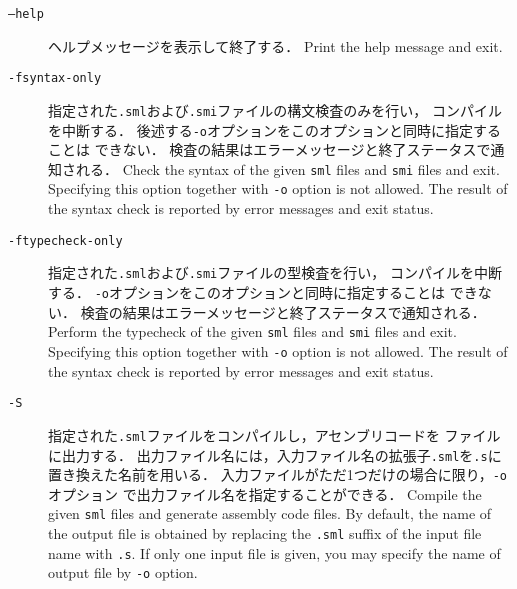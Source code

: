 \documentclass{jbook}
\begin{document}
\begin{description}
\item[{\tt --help}]
\ifjp%
	ヘルプメッセージを表示して終了する．
\else%
	Print the help message and exit.
\fi%

\item[{\tt -fsyntax-only}]
\ifjp%
	指定された{\tt .sml}および{\tt .smi}ファイルの構文検査のみを行い，
コンパイルを中断する．
	後述する{\tt -o}オプションをこのオプションと同時に指定することは
できない．
	検査の結果はエラーメッセージと終了ステータスで通知される．
\else%
	Check the syntax of the given {\tt sml} files and {\tt smi} files
and exit.
	Specifying this option together with {\tt -o} option is not
allowed.
	The result of the syntax check is reported by error messages
and exit status.
\fi%

\item[{\tt -ftypecheck-only}]
\ifjp%
	指定された{\tt .sml}および{\tt .smi}ファイルの型検査を行い，
コンパイルを中断する．
	{\tt -o}オプションをこのオプションと同時に指定することは
できない．
	検査の結果はエラーメッセージと終了ステータスで通知される．
\else%
        Perform the typecheck of the given {\tt sml} files and {\tt smi} files
and exit.
	Specifying this option together with {\tt -o} option is not
allowed.
	The result of the syntax check is reported by error messages
and exit status.
\fi%

\item[{\tt -S}]
\ifjp%
	指定された{\tt .sml}ファイルをコンパイルし，アセンブリコードを
ファイルに出力する．
	出力ファイル名には，入力ファイル名の拡張子{\tt .sml}を{\tt .s}に
置き換えた名前を用いる．
	入力ファイルがただ1つだけの場合に限り，{\tt -o}オプション
で出力ファイル名を指定することができる．
\else%
	Compile the given {\tt sml} files and generate assembly code files.
	By default,
the name of the output file is obtained by replacing the {\tt .sml}
suffix of the input file name with {\tt .s}.
	If only one input file is given,
you may specify the name of output file by {\tt -o} option.
\fi%


\end{description}
\end{document}
